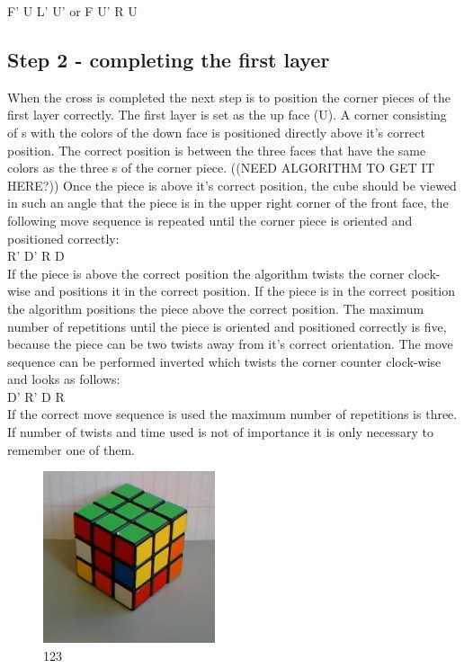 F' U L' U' or F U' R U

\subsection{Step 2 - completing the first layer}
When the cross is completed the next step is to position the corner pieces of the first layer correctly. The first layer is set as the up face (U). A corner consisting of \facet{}s with the colors of the down face is positioned directly above it's correct  position. The correct position is between the three faces that have the same colors as the three \facet{}s of the corner piece. ((NEED ALGORITHM TO GET IT HERE?)) Once the piece is above it's correct position, the cube should be viewed in such an angle that the piece is in the upper right corner of the front face, the following move sequence is repeated until the corner piece is oriented and positioned correctly: \\

R' D' R D \\

If the piece is above the correct position the algorithm twists the corner clock-wise and positions it in the correct position. If the piece is in the correct position the algorithm positions the piece above the correct position. The maximum number of repetitions until the piece is oriented and positioned correctly is five, because the piece can be two twists away from it's correct orientation. 
The move sequence can be performed inverted which twists the corner counter clock-wise and looks as follows: \\

D' R' D R \\

If the correct move sequence is used the maximum number of repetitions is three. If number of twists and time used is not of importance it is only necessary to remember one of them.

\begin{figure}
\begin{center}
	\includegraphics[width=0.45\textwidth]{input/pics/2FL.jpg}	
\end{center}
\caption{123}
\label{fig:2FL}
\end{figure}

